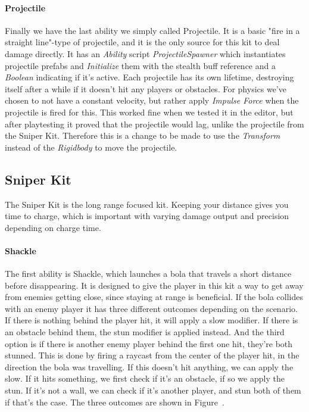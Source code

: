 \paragraph{Projectile}
Finally we have the last ability we simply called Projectile. It is a basic "fire in a straight line"-type of projectile, and it is the only source for this kit to deal damage directly. It has an \emph{Ability} script \emph{ProjectileSpawner} which instantiates projectile prefabs and \emph{Initialize} them with the stealth buff reference and a \emph{Boolean} indicating if it's active. Each projectile has its own lifetime, destroying itself after a while if it doesn't hit any players or obstacles. For physics we've chosen to not have a constant velocity, but rather apply \emph{Impulse Force} when the projectile is fired for this. This worked fine when we tested it in the editor, but after playtesting it proved that the projectile would lag, unlike the projectile from the Sniper Kit. Therefore this is a change to be made to use the \emph{Transform} instead of the \emph{Rigidbody} to move the projectile.

\subsection{Sniper Kit}
The Sniper Kit is the long range focused kit. Keeping your distance gives you time to charge, which is important with varying damage output and precision depending on charge time.

\paragraph{Shackle}
The first ability is Shackle, which launches a bola that travels a short distance before disappearing. It is designed to give the player in this kit a way to get away from enemies getting close, since staying at range is beneficial. If the bola collides with an enemy player it has three different outcomes depending on the scenario. If there is nothing behind the player hit, it will apply a slow modifier. If there is an obstacle behind them, the stun modifier is applied instead. And the third option is if there is another enemy player behind the first one hit, they're both stunned. This is done by firing a raycast from the center of the player hit, in the direction the bola was travelling. If this doesn't hit anything, we can apply the slow. If it hits something, we first check if it's an obstacle, if so we apply the stun. If it's not a wall, we can check if it's another player, and stun both of them if that's the case. The three outcomes are shown in Figure~.

